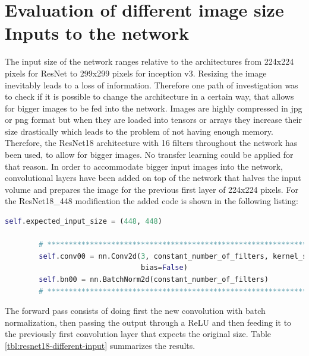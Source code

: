 \section{Evaluation of different image size Inputs to the network}

The input size of the network ranges relative to the architectures from 224x224 pixels for ResNet to 299x299 pixels for inception v3. Resizing the image inevitably leads to a loss of information. Therefore one path of investigation was to check if it is possible to change the architecture in a certain way, that allows for bigger images to be fed into the network. Images are highly compressed in jpg or png format but when they are loaded into tensors or arrays they increase their size drastically which leads to the problem of not having enough memory. Therefore, the ResNet18 architecture with 16 filters throughout the network has been used, to allow for bigger images. No transfer learning could be applied for that reason. In order to accommodate bigger input images into the network, convolutional layers have been added on top of the network that halves the input volume and prepares the image for the previous first layer of 224x224 pixels. For the ResNet18\_448 modification the added code is shown in the following listing:

\begin{minipage}{\linewidth}
\begin{lstlisting}[language=Python, caption=Python example, basicstyle=\tiny]
        self.expected_input_size = (448, 448)

        # ************************************************************************************************
        self.conv00 = nn.Conv2d(3, constant_number_of_filters, kernel_size=7, stride=2, padding=3,
                                bias=False)
        self.bn00 = nn.BatchNorm2d(constant_number_of_filters)
        # ************************************************************************************************
\end{lstlisting}
\end{minipage}

The forward pass consists of doing first the new convolution with batch normalization, then passing the output through a ReLU and then feeding it to the previously first convolution layer that expects the original size. Table \ref{tbl:resnet18-different-input} summarizes the results.

